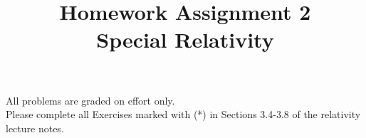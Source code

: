 \documentclass[12pt]{article}
\begin{document}
\date{\vspace{-5ex}}

\title{Homework Assignment 2 \\ Special Relativity}

\maketitle

\noindent
All problems are graded on effort only.\\

\noindent
Please complete all Exercises marked with (*) in Sections 3.4-3.8 of
the relativity lecture notes.\\
\end{document}
